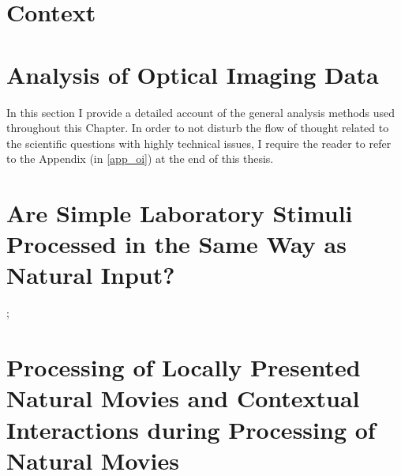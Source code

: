 \section{Context} 

	


\section{Analysis of Optical Imaging Data} 

In this section I provide a detailed account of the general analysis
methods used throughout this Chapter. In order to not disturb the flow of
thought related to the scientific questions with highly technical issues, I
require the reader to refer to the Appendix (in \ref{app_oi}) at the end of
this thesis.


\section[Processing of Natural Stimuli in V1]{Are Simple Laboratory Stimuli
Processed in the Same Way as Natural Input?} 


\label{fullfield} 
 

		
		
		
		; 
\pagebreak
%
\section[Contextual Effects under Natural Conditions]{Processing of Locally Presented Natural Movies and Contextual
Interactions during Processing of Natural Movies}
\label{local}
	
%		 
		
\pagebreak
